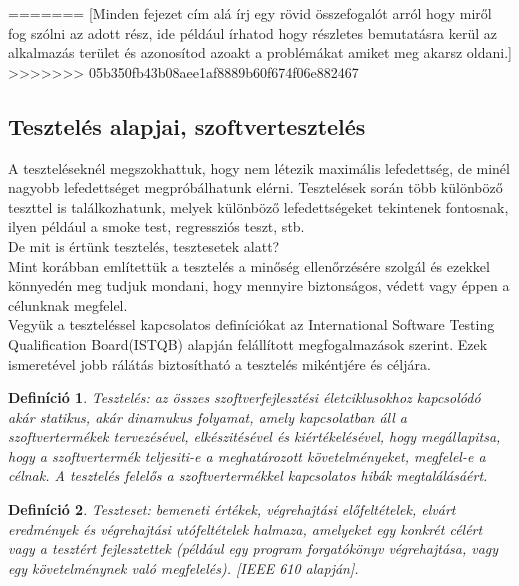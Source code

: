 \documentclass[12pt]{article}
\newtheorem{defin}{Definíció}[section]
\begin{document}
=======
[Minden fejezet cím alá írj egy rövid összefogalót arról hogy miről fog szólni az adott rész, ide például írhatod hogy részletes bemutatásra kerül az alkalmazás terület és azonosítod azoakt a problémákat amiket meg akarsz oldani.]
>>>>>>> 05b350fb43b08aee1af8889b60f674f06e882467

\subsection{Tesztelés alapjai, szoftvertesztelés}

A teszteléseknél megszokhattuk, hogy nem létezik maximális lefedettség, de minél nagyobb lefedettséget megpróbálhatunk elérni. Tesztelések során több különböző teszttel is találkozhatunk, melyek különböző lefedettségeket tekintenek fontosnak, ilyen például a smoke test, regressziós teszt, stb.\\

De mit is értünk tesztelés, tesztesetek alatt?\\
Mint korábban említettük a tesztelés a minőség ellenőrzésére szolgál és ezekkel könnyedén meg tudjuk mondani, hogy mennyire biztonságos, védett vagy éppen a célunknak megfelel.\\

Vegyük a teszteléssel kapcsolatos definíciókat az International Software Testing Qualification Board(ISTQB) alapján felállított megfogalmazások szerint. Ezek ismeretével jobb rálátás biztosítható a tesztelés mikéntjére és céljára.\\

\begin{defin}
Tesztelés: az összes szoftverfejlesztési életciklusokhoz kapcsolódó akár statikus, akár dinamukus folyamat, amely kapcsolatban áll a szoftvertermékek tervezésével, elkészitésével és kiértékelésével, hogy megállapitsa, hogy a szoftvertermék teljesiti-e a meghatározott követelményeket, megfelel-e a célnak. A tesztelés felelős a szoftvertermékkel kapcsolatos hibák megtalálásáért. ~\cite{htb:masterfield}
\end{defin}

\begin{defin}
Teszteset: bemeneti értékek, végrehajtási előfeltételek, elvárt eredmények és végrehajtási utófeltételek halmaza, amelyeket egy konkrét célért vagy a tesztért fejlesztettek (például egy program forgatókönyv végrehajtása, vagy egy követelménynek való megfelelés). [IEEE 610 alapján]. ~\cite{htb:masterfield}
\end{defin}
\end{document}
